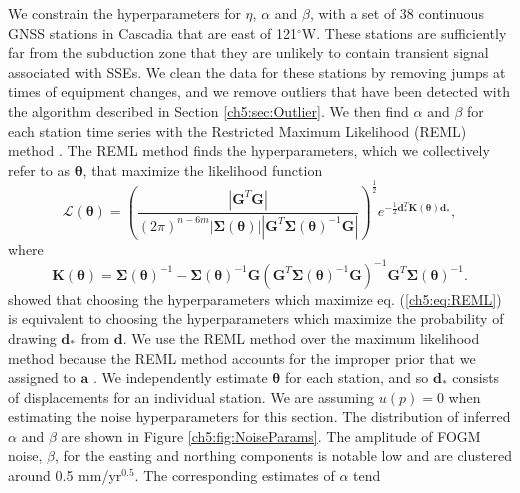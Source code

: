 We constrain the hyperparameters for $\eta$, $\alpha$ and $\beta$,
with a set of 38 continuous GNSS stations in Cascadia that are east of
121$^\circ$W.  These stations are sufficiently far from the subduction
zone that they are unlikely to contain transient signal associated
with SSEs.  We clean the data for these stations by removing jumps at
times of equipment changes, and we remove outliers that have been
detected with the algorithm described in Section
\ref{ch5:sec:Outlier}. We then find $\alpha$ and $\beta$ for each
station time series with the Restricted Maximum Likelihood (REML)
method \cite[e.g.,][]{Harville1974,Cressie1992,Hines2017}. The REML
method finds the hyperparameters, which we collectively refer to as
$\mathbf{\theta}$, that maximize the likelihood function
\begin{equation}\label{ch5:eq:REML}
\mathcal{L}(\mathbf{\theta}) = \left(\frac{\left|\mathbf{G}^T\mathbf{G}\right|}
                           {(2\pi)^{n-6m} 
                           \left| \mathbf{\Sigma}(\mathbf{\theta}) \right| 
                           \left| \mathbf{G}^T\mathbf{\Sigma}(\mathbf{\theta})^{-1}\mathbf{G} \right|}\right)^{\frac{1}{2}} 
                           e^{-\tfrac{1}{2}\mathbf{d}_*^T\mathbf{K}(\mathbf{\theta})\mathbf{d}_*},
\end{equation}
where
\begin{equation}
\mathbf{K}(\mathbf{\theta}) = \mathbf{\Sigma}(\mathbf{\theta})^{-1} - 
                      \mathbf{\Sigma}(\mathbf{\theta})^{-1}\mathbf{G}
         \left(\mathbf{G}^T\mathbf{\Sigma}(\mathbf{\theta})^{-1}\mathbf{G}\right)^{-1}
         \mathbf{G}^T\mathbf{\Sigma}(\mathbf{\theta})^{-1}.
\end{equation}
\citet{Harville1974} showed that choosing the hyperparameters which
maximize eq. (\ref{ch5:eq:REML}) is equivalent to choosing the
hyperparameters which maximize the probability of drawing
$\mathbf{d}_*$ from $\mathbf{d}$. We use the REML method over the
maximum likelihood method \citep[e.g.,][]{Langbein1997} because the
REML method accounts for the improper prior that we assigned to
$\mathbf{a}$ \citep{Hines2017}. We independently estimate
$\mathbf{\theta}$ for each station, and so $\mathbf{d}_*$ consists of
displacements for an individual station. We are assuming $u(p)=0$ when
estimating the noise hyperparameters for this section. The
distribution of inferred $\alpha$ and $\beta$ are shown in Figure
\ref{ch5:fig:NoiseParams}. The amplitude of FOGM noise, $\beta$, for
the easting and northing components is notable low and are clustered
around 0.5 mm/yr$^{0.5}$. The corresponding estimates of $\alpha$ tend
